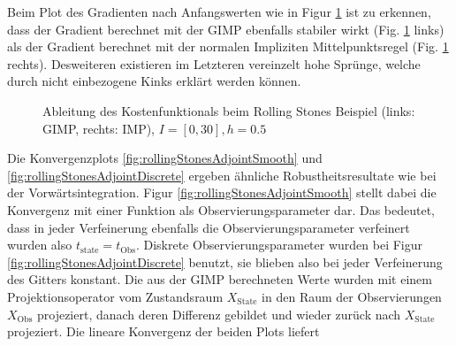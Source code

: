 Beim Plot des Gradienten nach Anfangswerten wie in Figur \ref{fig:rollingGrad} ist zu erkennen, dass der Gradient berechnet mit der GIMP ebenfalls stabiler wirkt (Fig. \ref{fig:rollingGrad} links) als der Gradient berechnet mit der normalen Impliziten Mittelpunktsregel (Fig. \ref{fig:rollingGrad} rechts). Desweiteren existieren im Letzteren vereinzelt hohe Sprünge, welche durch nicht einbezogene Kinks erklärt werden können. 
\begin{figure}[H]
\footnotesize 
\centering
\begin{minipage}[b]{0.49\linewidth}

\end{minipage}
\begin{minipage}[b]{0.49\linewidth}

\end{minipage}
\begin{minipage}[b]{0.49\linewidth}

\end{minipage}
\begin{minipage}[b]{0.49\linewidth}

\end{minipage}
\caption{Ableitung des Kostenfunktionals beim Rolling Stones Beispiel (links: GIMP, rechts: IMP), $I = [0,30],h=0.5$}
\label{fig:rollingGrad}
\end{figure}


Die Konvergenzplots \ref{fig:rollingStonesAdjointSmooth} und \ref{fig:rollingStonesAdjointDiscrete} ergeben ähnliche Robustheitsresultate wie bei der Vorwärtsintegration. Figur \ref{fig:rollingStonesAdjointSmooth} stellt dabei die Konvergenz mit einer Funktion als Observierungsparameter dar. Das bedeutet, dass in jeder Verfeinerung ebenfalls die Observierungsparameter verfeinert wurden also $t_{\text{state}} = t_{\text{Obs}}$. Diskrete Observierungsparameter wurden bei Figur \ref{fig:rollingStonesAdjointDiscrete} benutzt, sie blieben also bei jeder Verfeinerung des Gitters konstant. Die aus der GIMP berechneten Werte wurden mit einem Projektionsoperator vom Zustandsraum $X_{\text{State}}$ in den Raum der Observierungen $X_{\text{Obs}}$ projeziert, danach deren Differenz gebildet und wieder zurück nach $X_{\text{State}}$ projeziert. Die lineare Konvergenz der beiden Plots liefert 



